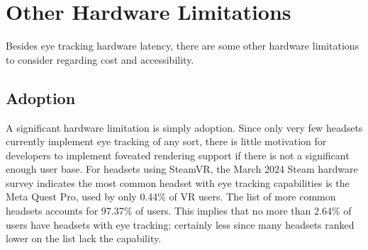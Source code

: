 \documentclass[a4paper,11pt]{article}
\begin{document}
\section{Other Hardware Limitations}
Besides eye tracking hardware latency, there are some other hardware limitations to consider regarding cost and accessibility.
\subsection{Adoption}
\label{adoption}
A significant hardware limitation is simply adoption. Since only very few headsets currently implement eye tracking of any sort, there is little motivation for developers to implement foveated rendering support if there is not a significant enough user base. For headsets using SteamVR, the March 2024 Steam hardware survey\cite{steam_hardware} indicates the most common headset with eye tracking capabilities is the Meta Quest Pro, used by only 0.44\% of VR users. The list of more common headsets accounts for 97.37\% of users. This implies that no more than 2.64\% of users have headsets with eye tracking; certainly less since many headsets ranked lower on the list lack the capability.
\end{document}
